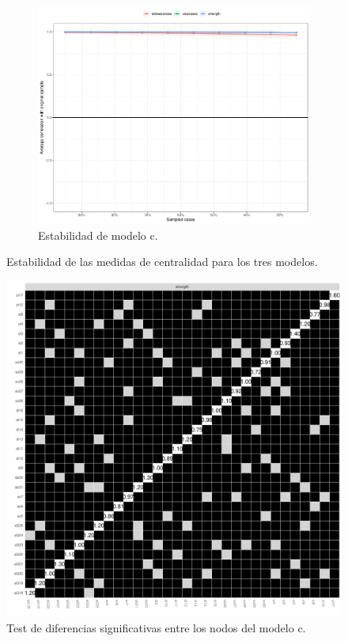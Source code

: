 \documentclass[11pt,spanish]{article}\usepackage[]{graphicx}\usepackage[]{color}
\begin{document}
\begin{figure}[ht]
\begin{subfigure}{0.6\textwidth}
    \includegraphics[width=\textwidth]{images/estability_todo.pdf}
    \caption{Estabilidad de modelo c.}
    \label{fig:estabilidad_todo}
\end{subfigure}
\caption{Estabilidad de las medidas de centralidad para los tres modelos.}
\label{fig:estabilidad}
\end{figure}


\begin{figure}[ht]
\centering
\includegraphics[scale=0.5]{images/signif_2i_todo.pdf}
\caption{Test de diferencias significativas entre los nodos del modelo c.}
\label{fig:sintodo}
\end{figure}
\end{document}
